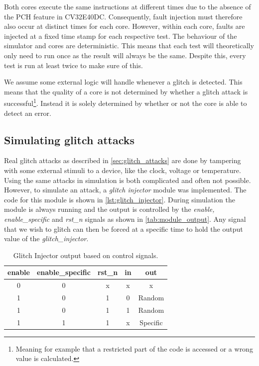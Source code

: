 Both cores execute the same instructions at different times due to the absence of the PCH feature in CV32E40DC. Consequently, fault injection must therefore also occur at distinct times for each core. However, within each core, faults are injected at a fixed time stamp for each respective test. The behaviour of the simulator and cores are deterministic. This means that each test will theoretically only need to run once as the result will always be the same. Despite this, every test is run at least twice to make sure of this.

We assume some external logic will handle whenever a glitch is detected. This means that the quality of a core is not determined by whether a glitch attack is successful\footnote{Meaning for example that a restricted part of the code is accessed or a wrong value is calculated.}. Instead it is solely determined by whether or not the core is able to detect an error. 

\subsection{Simulating glitch attacks}
\label{subsec:sim_glitch}

Real glitch attacks as described in \autoref{sec:glitch_attacks} are done by tampering with some external stimuli to a device, like the clock, voltage or temperature. Using the same attacks in simulation is both complicated and often not possible. However, to simulate an attack, a \textit{glitch injector} module was implemented. The code for this module is shown in \autoref{lst:glitch_injector}. During simulation the module is always running and the output is controlled by the \textit{enable, enable\_specific} and \textit{rst\_n} signals as shown in \autoref{tab:module_output}. Any signal that we wish to glitch can then be forced at a specific time to hold the output value of the \textit{glitch\_injector}.

\begin{table}[h]
\centering
\caption{Glitch Injector output based on control signals.}
\label{tab:module_output}
\begin{tabular}{ccccc}
\toprule 
\rowcolor{black!20} \textbf{enable} & \textbf{enable\_specific} & \textbf{rst\_n} & \textbf{in} & \textbf{out} \\
\midrule
0 & 0 & x & x & x \\
\rowcolor{black!20} 1 & 0 & 1 & 0 & Random \\
1 & 0 & 1 & 1 & Random \\
\rowcolor{black!20} 1 & 1 & 1 & x & Specific \\
\bottomrule
\end{tabular}
\end{table}

